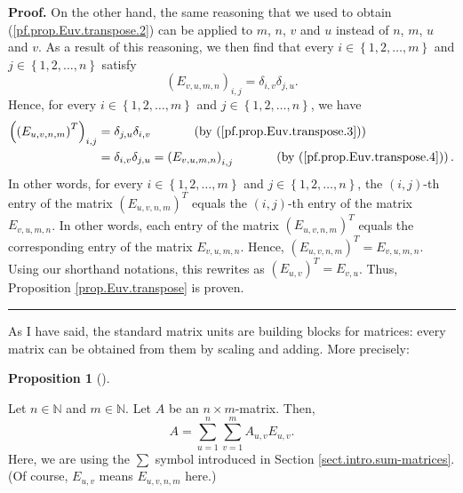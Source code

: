 \documentclass[numbers=enddot,12pt,final,onecolumn,notitlepage]{scrartcl}%
\theoremstyle{definition}
\newtheorem{prop}[theo]{Proposition}
\newenvironment{proposition}[1][]
{\begin{prop}[#1]\begin{leftbar}}
{\end{leftbar}\end{prop}}
\newenvironment{proof}[1][Proof]{\noindent\textbf{#1.} }{\ \rule{0.5em}{0.5em}}
\let\sumnonlimits\sum
\renewcommand{\sum}{\sumnonlimits\limits}
\begin{document}
\begin{proof}
On the other hand, the same reasoning that we used to obtain
(\ref{pf.prop.Euv.transpose.2}) can be applied to $m$, $n$, $v$ and $u$
instead of $n$, $m$, $u$ and $v$. As a result of this reasoning, we then find
that every $i\in\left\{  1,2,\ldots,m\right\}  $ and $j\in\left\{
1,2,\ldots,n\right\}  $ satisfy%
\begin{equation}
\left(  E_{v,u,m,n}\right)  _{i,j}=\delta_{i,v}\delta_{j,u}.
\label{pf.prop.Euv.transpose.4}%
\end{equation}
Hence, for every $i\in\left\{  1,2,\ldots,m\right\}  $ and $j\in\left\{
1,2,\ldots,n\right\}  $, we have%
\begin{align*}
\left(  \left(  E_{u,v,n,m}\right)  ^{T}\right)  _{i,j}  &  =\delta
_{j,u}\delta_{i,v}\ \ \ \ \ \ \ \ \ \ \left(  \text{by
(\ref{pf.prop.Euv.transpose.3})}\right) \\
&  =\delta_{i,v}\delta_{j,u}=\left(  E_{v,u,m,n}\right)  _{i,j}%
\ \ \ \ \ \ \ \ \ \ \left(  \text{by (\ref{pf.prop.Euv.transpose.4})}\right)
.
\end{align*}
In other words, for every $i\in\left\{  1,2,\ldots,m\right\}  $ and
$j\in\left\{  1,2,\ldots,n\right\}  $, the $\left(  i,j\right)  $-th entry of
the matrix $\left(  E_{u,v,n,m}\right)  ^{T}$ equals the $\left(  i,j\right)
$-th entry of the matrix $E_{v,u,m,n}$. In other words, each entry of the
matrix $\left(  E_{u,v,n,m}\right)  ^{T}$ equals the corresponding entry of
the matrix $E_{v,u,m,n}$. Hence, $\left(  E_{u,v,n,m}\right)  ^{T}%
=E_{v,u,m,n}$. Using our shorthand notations, this rewrites as $\left(
E_{u,v}\right)  ^{T}=E_{v,u}$. Thus, Proposition \ref{prop.Euv.transpose} is proven.
\end{proof}

As I have said, the standard matrix units are building blocks for matrices:
every matrix can be obtained from them by scaling and adding. More precisely:

\begin{proposition}
\label{prop.Euv.A=sum}Let $n\in\mathbb{N}$ and $m\in\mathbb{N}$. Let $A$ be an
$n\times m$-matrix. Then,%
\[
A=\sum_{u=1}^{n}\sum_{v=1}^{m}A_{u,v}E_{u,v}.
\]
Here, we are using the $\sum$ symbol introduced in Section
\ref{sect.intro.sum-matrices}. (Of course, $E_{u,v}$ means $E_{u,v,n,m}$ here.)
\end{proposition}
\end{document}
